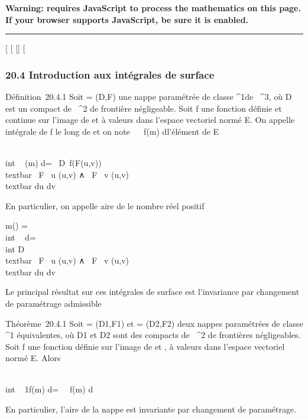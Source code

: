 \textbf{Warning: 
requires JavaScript to process the mathematics on this page.\\ If your
browser supports JavaScript, be sure it is enabled.}

\begin{center}\rule{3in}{0.4pt}\end{center}

{[}
{[}
{[}{]}
{[}

\subsubsection{20.4 Introduction aux intégrales de surface}

Définition~20.4.1 Soit \Sigma = (D,F) une nappe paramétrée de classe
^1de ~^3, où D est un compact de ~^2
de frontière négligeable. Soit f une fonction définie et continue sur
l'image de \Sigma et à valeurs dans l'espace vectoriel normé E. On appelle
intégrale de f le long de \Sigma et on note \int ~
\int  \Sigma~f(m) d\sigma l'élément de E

\int  \\int ~
\Sigmaf(m) d\sigma =\int ~
\int  D~f(F(u,v))
\\textbar{} \partial~F \over \partial~u (u,v) ∧ \partial~F
\over \partial~v (u,v)\\textbar{} du dv

En particulier, on appelle aire de \Sigma le nombre réel positif

m(\Sigma) =\int  \\int ~
\Sigma d\sigma =\int ~ \\int
 D\\textbar{} \partial~F \over \partial~u
(u,v) ∧ \partial~F \over \partial~v (u,v)\\textbar{}
du dv

Le principal résultat sur ces intégrales de surface est l'invariance par
changement de paramétrage admissible

Théorème~20.4.1 Soit  = (D1,F1) et
 = (D2,F2) deux nappes paramétrées de
classe ^1 équivalentes, où D1 et D2 sont
des compacts de ~^2 de frontières négligeables. Soit f une
fonction définie sur l'image de  et , à valeurs
dans l'espace vectoriel normé E. Alors

\int  \\int ~
\Sigma1f(m) d\sigma =\int ~
\int  {}~f(m) d\sigma

En particulier, l'aire de la nappe est invariante par changement de
paramétrage.

